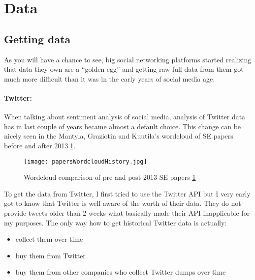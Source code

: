 \section{Data}
\subsection{Getting data} \label{ssec:GettingData}
As you will have a chance to see, big social networking platforms started realizing that data they own are a “golden egg” and getting raw full data from them got much more difficult than it was in the early years of social media age.

\paragraph{Twitter:}
When talking about sentiment analysis of social media, analysis of Twitter data has in last couple of years became almost a default choice. This change can be nicely seen in the Mantyla, Graziotin and Kuutila's \cite{mantyla2018evolution} wordcloud of SE papers before and after 2013.\ref{fig:papersWordcloudHistory}.

\begin{figure}[H]%
    \centering
	\texttt{[image: papersWordcloudHistory.jpg]}
    \caption{Wordcloud comparison of pre and post 2013 SE papers \ref{fig:papersWordcloudHistory}}%
    \label{fig:papersWordcloudHistory}%
\end{figure}

To get the data from Twitter,  I first tried to use the Twitter API but I very early got to know that Twitter is well aware of the worth of their data. They do not provide tweets older than 2 weeks what basically made their API inapplicable for my purposes. The only way how to get historical Twitter data is actually:

\begin{itemize}
  \item collect them over time
  \item buy them from Twitter
  \item buy them from other companies who collect Twitter dumps over time
\end{itemize}

